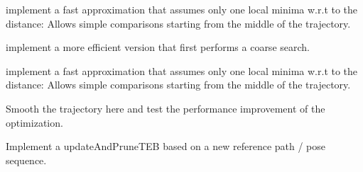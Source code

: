 \begin{DoxyRefList}
implement a fast approximation that assumes only one local minima w.\+r.\+t to the distance\+: Allows simple comparisons starting from the middle of the trajectory. 
\item[全局 \mbox{\hyperlink{classteb__local__planner_1_1TimedElasticBand_a0c33751be8735fb910738827d1da3f94}{teb\+\_\+local\+\_\+planner\+::Timed\+Elastic\+Band\+::find\+Closest\+Trajectory\+Pose}} (const Point2d\+Container \&vertices, double $\ast$distance=NULL) const]\label{todo__todo000012}%
%
implement a more efficient version that first performs a coarse search. 

implement a fast approximation that assumes only one local minima w.\+r.\+t to the distance\+: Allows simple comparisons starting from the middle of the trajectory. 
\item[全局 \mbox{\hyperlink{classteb__local__planner_1_1TimedElasticBand_adae6e7423ed1583f5daedac57562384e}{teb\+\_\+local\+\_\+planner\+::Timed\+Elastic\+Band\+::update\+And\+Prune\+TEB}} (boost\+::optional$<$ const Pose\+SE2 \& $>$ new\+\_\+start, boost\+::optional$<$ const Pose\+SE2 \& $>$ new\+\_\+goal, int min\+\_\+samples=3)]\label{todo__todo000009}%
%
Smooth the trajectory here and test the performance improvement of the optimization. 

Implement a update\+And\+Prune\+TEB based on a new reference path / pose sequence.
\end{DoxyRefList}